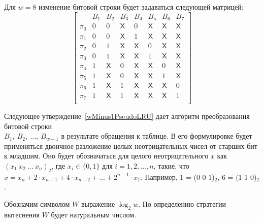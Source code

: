 Для $w=8$ изменение битовой строки будет задаваться следующей матрицей:
$$
\left[
  \begin{array}{c|ccccccc}
          & B_1 & B_2 & B_3 & B_4 & B_5 & B_6 & B_7 \\ \hline
    \pi_0 & 0 & 0 & \textsf{X} & 0 & \textsf{X} & \textsf{X} & \textsf{X} \\
    \pi_1 & 0 & 0 & \textsf{X} & 1 & \textsf{X} & \textsf{X} & \textsf{X} \\
    \pi_2 & 0 & 1 & \textsf{X} & \textsf{X} & 0 & \textsf{X} & \textsf{X} \\
    \pi_3 & 0 & 1 & \textsf{X} & \textsf{X} & 1 & \textsf{X} & \textsf{X} \\
    \pi_4 & 1 & \textsf{X} & 0 & \textsf{X} & \textsf{X} & 0 & \textsf{X} \\
    \pi_5 & 1 & \textsf{X} & 0 & \textsf{X} & \textsf{X} & 1 & \textsf{X} \\
    \pi_6 & 1 & \textsf{X} & 1 & \textsf{X} & \textsf{X} & \textsf{X} & 0 \\
    \pi_7 & 1 & \textsf{X} & 1 & \textsf{X} & \textsf{X} & \textsf{X} & 1 \\
  \end{array}
\right]
$$

Следующее утверждение~\ref{wMinus1PseudoLRU} дает алгоритм
преобразования битовой строки\\ $B_1,~B_2,~...,~B_{w{-}1}$ в результате
обращения к таблице. В его формулировке будет применяться двоичное
разложение целых неотрицательных чисел от старших бит к младшим. Оно будет обозначаться для целого неотрицательного $x$ как $(x_1~x_2~...~x_n)_2$, где $x_i \in \{0, 1\}$ для $i = 1, 2, ..., n$, такие, что $x = x_n + 2{\cdot}x_{n-1} + 4{\cdot}x_{n-2} + \dots + 2^{n-1}{\cdot}x_1$. Например, 1 = (0 0 1)$_2$, 6 = (1 1 0)$_2$.

Обозначим символом $W$ выражение $\log_2 w$. По определению
стратегии вытеснения \PseudoLRU $W$ будет натуральным числом.


